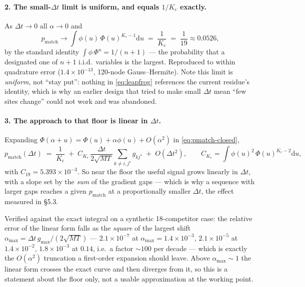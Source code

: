 \documentclass[11pt,a4paper]{article}
\newcommand{\dt}{\Delta t}
\newcommand{\pmatch}{p_{\mathrm{match}}}
\newcommand{\Mass}{M}
\newcommand{\Ncomp}{K_{\mathrm{c}}}
\begin{document}
\paragraph{2. The small-$\dt$ limit is uniform, and equals $1/\Ncomp$
exactly.} As $\dt\to0$ all $\alpha \to 0$ and
\begin{equation}
  \pmatch \longrightarrow \int \phi(u)\,\Phi(u)^{\Ncomp-1}\mathrm{d}u
  \;=\; \frac{1}{\Ncomp} \;=\; \frac{1}{19} \approx 0.0526 ,
\end{equation}
by the standard identity $\int\phi\,\Phi^{n} = 1/(n+1)$ --- the probability
that a designated one of $n+1$ i.i.d.\ variables is the largest. Reproduced to
within quadrature error ($1.4\times10^{-13}$, 120-node Gauss--Hermite). Note this limit is \emph{uniform}, not ``stay put'':
nothing in \eqref{eq:leapfrog} references the current residue's identity,
which is why an earlier design that tried to make small $\dt$ mean ``few sites
change'' could not work and was abandoned.

\paragraph{3. The approach to that floor is linear in $\dt$.} Expanding
$\Phi(\alpha+u) = \Phi(u) + \alpha\phi(u) + O(\alpha^{2})$ in
\eqref{eq:pmatch-closed},
\begin{equation}
  \pmatch(\dt) \;=\; \frac{1}{\Ncomp}
  \;+\; C_{\Ncomp}\,\frac{\dt}{2\sqrt{\Mass T}}
        \sum_{k \neq i,j^{\star}} g_{kj^{\star}}
  \;+\; O(\dt^{2}),
  \qquad
  C_{\Ncomp} = \int \phi(u)^{2}\,\Phi(u)^{\Ncomp-2}\mathrm{d}u ,
\end{equation}
with $C_{19} = 5.393\times10^{-3}$. So near the floor the useful signal grows
linearly in $\dt$, with a slope set by the \emph{sum} of the gradient gaps ---
which is why a sequence with larger gaps reaches a given $\pmatch$ at a
proportionally smaller $\dt$, the effect measured in \S5.3.

Verified against the exact integral on a synthetic 18-competitor case: the
relative error of the linear form falls as the \emph{square} of the largest
shift $\alpha_{\max} = \dt\,g_{\max}/(2\sqrt{\Mass T})$ --- $2.1\times10^{-7}$
at $\alpha_{\max}=1.4\times10^{-3}$, $2.1\times10^{-5}$ at
$1.4\times10^{-2}$, $1.8\times10^{-3}$ at $0.14$, i.e.\ a factor $\sim\!100$
per decade --- which is exactly the $O(\alpha^{2})$ truncation a first-order
expansion should leave. Above $\alpha_{\max}\sim1$ the linear form crosses the
exact curve and then diverges from it, so this is a statement about the floor
only, not a usable approximation at the working point.
\end{document}
